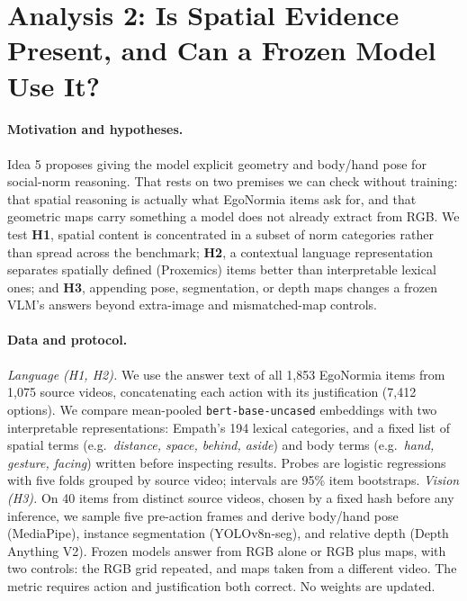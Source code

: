 
\section{Analysis 2: Is Spatial Evidence Present, and Can a Frozen Model Use It?}

\paragraph{Motivation and hypotheses.} Idea 5 proposes giving the model explicit geometry and body/hand pose for social-norm reasoning. That rests on two premises we can check without training: that spatial reasoning is actually what EgoNormia items ask for, and that geometric maps carry something a model does not already extract from RGB. We test \textbf{H1}, spatial content is concentrated in a subset of norm categories rather than spread across the benchmark; \textbf{H2}, a contextual language representation separates spatially defined (Proxemics) items better than interpretable lexical ones; and \textbf{H3}, appending pose, segmentation, or depth maps changes a frozen VLM's answers beyond extra-image and mismatched-map controls.

\paragraph{Data and protocol.} \emph{Language (H1, H2).} We use the answer text of all 1{,}853 EgoNormia items \citep{rezaei2025egonormia} from 1{,}075 source videos, concatenating each action with its justification (7{,}412 options). We compare mean-pooled \texttt{bert-base-uncased} embeddings with two interpretable representations: Empath's 194 lexical categories, and a fixed list of spatial terms (e.g.\ \emph{distance, space, behind, aside}) and body terms (e.g.\ \emph{hand, gesture, facing}) written before inspecting results. Probes are logistic regressions with five folds grouped by source video; intervals are 95\% item bootstraps. \emph{Vision (H3).} On 40 items from distinct source videos, chosen by a fixed hash before any inference, we sample five pre-action frames and derive body/hand pose (MediaPipe), instance segmentation (YOLOv8n-seg), and relative depth (Depth Anything V2). Frozen models answer from RGB alone or RGB plus maps, with two controls: the RGB grid repeated, and maps taken from a different video. The metric requires action and justification both correct. No weights are updated.

